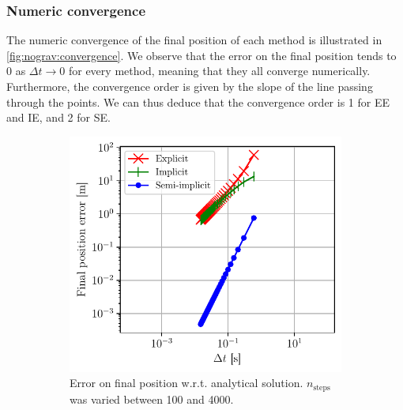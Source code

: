 \subsubsection{Numeric convergence}

The numeric convergence of the final position of each method is illustrated in \autoref{fig:nograv:convergence}. We observe that the error on the final position tends to 0 as $\Delta t \rightarrow 0$ for every method, meaning that they all converge numerically. Furthermore, the convergence order is given by the slope of the line passing through the points. We can thus deduce that the convergence order is 1 for EE and IE, and 2 for SE.

\begin{figure}[h]
    \centering
    \begin{subfigure}{0.45\linewidth}
        \centering
        \includegraphics[width=\linewidth]{figures/nograv_numeric_convergence_all.pdf}
        \caption{Error on final position w.r.t. analytical solution. $n_\textrm{steps}$ was varied between 100 and 4000.}
        \label{fig:nograv:convergence}
    \end{subfigure}
    \hspace*{0.2cm}
    \begin{subfigure}{0.45\linewidth}
        \centering

\end{subfigure}
\end{figure}
